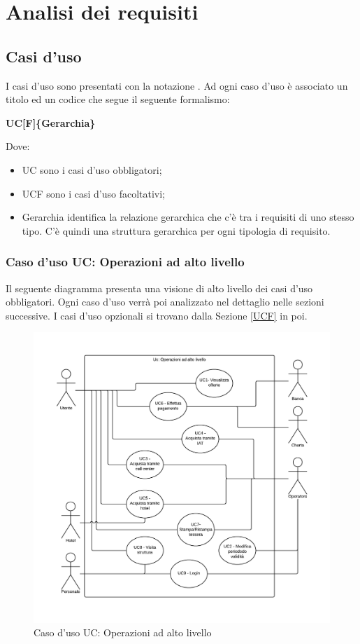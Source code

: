 \clearpage\null\newpage
\section{Analisi dei requisiti}\label{analisideirequisiti}
\subsection{Casi d'uso}

I casi d'uso sono presentati con la notazione .
Ad ogni caso d'uso è associato un titolo ed un codice che segue il seguente formalismo:

\begin{center}
\textbf{UC[F]\{Gerarchia\}}
\end{center}

Dove:
\begin{itemize}
\item UC sono i casi d'uso obbligatori;
\item UCF sono i casi d'uso facoltativi;
\item Gerarchia identifica la relazione gerarchica che c'è tra i requisiti di uno stesso tipo. C'è quindi una struttura gerarchica per ogni tipologia di requisito.
\end{itemize}

\subsubsection{Caso d'uso UC: Operazioni ad alto livello}\label{UC}
Il seguente diagramma presenta una visione di alto livello dei casi d'uso obbligatori. Ogni caso d'uso verrà poi analizzato nel dettaglio nelle sezioni successive. I casi d'uso opzionali si trovano dalla Sezione \ref{UCF} in poi.

\begin{figure}[H]
\centering
\includegraphics[width=1\textwidth]{images/UC.png}
\caption{Caso d'uso UC: Operazioni ad alto livello}
\end{figure}

